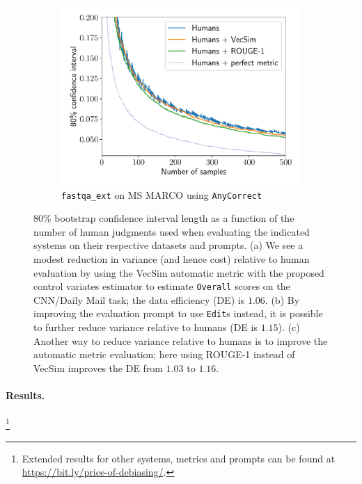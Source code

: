 \begin{figure}[!p]
  \begin{subfigure}[b]{0.6\textwidth}
  \includegraphics[width=\textwidth]{figures/msmarco_trajectory}
  \caption{\label{fig:trajectory-c}\texttt{fastqa\_ext} on MS MARCO using \texttt{AnyCorrect}}
  \end{subfigure}

  \caption[Confidence intervals as a function of the number of human judgments used when evaluating systems]{\label{fig:trajectory} 80\% bootstrap confidence interval length as a function of the number of human judgments used when evaluating the indicated systems on their respective datasets and prompts.
  (a) We see a modest reduction in variance (and hence cost) relative to human evaluation by using the VecSim automatic metric with the proposed control variates estimator to estimate \texttt{Overall} scores on the CNN/Daily Mail task; the data efficiency (DE) is $1.06$.
  (b) By improving the evaluation prompt to use \texttt{Edit}s instead, it is possible to further reduce variance relative to humans (DE is $1.15$).
  (c) Another way to reduce variance relative to humans is to improve the automatic metric evaluation; here using ROUGE-1 instead of VecSim improves the DE from $1.03$ to $1.16$.
  }
\end{figure}

\paragraph{Results.}\footnote{%
  Extended results for other systems, metrics and prompts can be found at \url{https://bit.ly/price-of-debiasing/}.}
  
